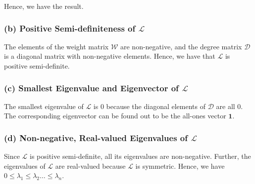 Hence, we have the result.

\subsubsection*{(b) Positive Semi-definiteness of \( \mathcal{L} \)}

The elements of the weight matrix \( \mathcal{W} \) are non-negative, and the degree matrix \( \mathcal{D} \) is a diagonal matrix with non-negative elements.
Hence, we have that \( \mathcal{L} \) is positive semi-definite.

\subsubsection*{(c) Smallest Eigenvalue and Eigenvector of \( \mathcal{L} \)}

The smallest eigenvalue of \( \mathcal{L} \) is 0 because the diagonal elements of \( \mathcal{D} \) are all 0.
The corresponding eigenvector can be found out to be the all-ones vector \( \mathbf{1} \).

\subsubsection*{(d) Non-negative, Real-valued Eigenvalues of \( \mathcal{L} \)}

Since \( \mathcal{L} \) is positive semi-definite, all its eigenvalues are non-negative.
Further, the eigenvalues of \( \mathcal{L} \) are real-valued because \( \mathcal{L} \) is symmetric.
Hence, we have \( 0 \leq \lambda_{1} \leq \lambda_{2} \ldots \leq \lambda_{n} \).
